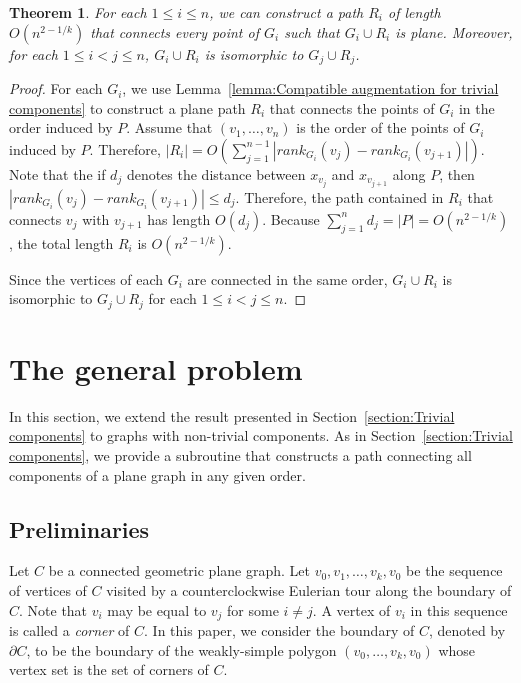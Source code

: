 \documentclass[a4paper, 11pt]{article}
\newtheorem{theorem}{Theorem}[section]
\begin{document}
\begin{theorem}
For each $1\leq i\leq n$, we can construct a path $R_i$ of length $O(n^{2-1/k})$ that connects every point of $G_i$ such that $G_i\cup R_i$ is plane. Moreover, for each $1\leq i < j \leq n$, $G_i\cup R_i$ is isomorphic to $G_j\cup R_j$.
\end{theorem}
\begin{proof}
For each $G_i$, we use Lemma~\ref{lemma:Compatible augmentation for trivial components} to construct a plane path $R_i$ that connects the points of $G_i$ in the order induced by $P$.
Assume that $(v_1, \ldots, v_n)$ is the order of the points of $G_i$ induced by $P$.
Therefore, $|R_i| = O\left(\sum_{j=1}^{n-1} |rank_{G_i}(v_j) - rank_{G_i}(v_{j+1}) |\right)$.
Note that the if $d_j$ denotes the distance between $x_{v_j}$ and $x_{v_{j+1}}$ along $P$, then
$|rank_{G_i}(v_j) - rank_{G_i}(v_{j+1})|\leq  d_j$. 
Therefore, the path contained in $R_i$ that connects $v_j$ with $v_{j+1}$ has length $O(d_j)$. 
Because $\sum_{j=1}^n d_j = |P| = O(n^{2-1/k})$, the total length $R_i$ is $O(n^{2-1/k})$.

Since the vertices of each $G_i$ are connected in the same order, $G_i\cup R_i$ is isomorphic to $G_j\cup R_j$ for each $1\leq i<j\leq n$.
\end{proof}


\section{The general problem}
In this section, we extend the result presented in Section~\ref{section:Trivial components} to graphs with non-trivial components.
As in Section~\ref{section:Trivial components}, we provide a subroutine that constructs a path connecting all components of a plane graph in any given order.

\subsection{Preliminaries}\label{section:Preliminaries}
Let $C$ be a connected geometric plane graph. Let $v_0, v_1, \ldots, v_k, v_0$ be the sequence of vertices of $C$ visited by a counterclockwise Eulerian tour along the boundary of $C$. Note that $v_i$ may be equal to $v_j$ for some $i\neq j$. 
A vertex of $v_i$ in this sequence is called a \emph{corner} of $C$.
In this paper, we consider the boundary of $C$, denoted by $\partial C$, to be the boundary of the weakly-simple polygon $(v_0, \ldots, v_k, v_0)$ whose vertex set is the set of corners of $C$.
\end{document}
